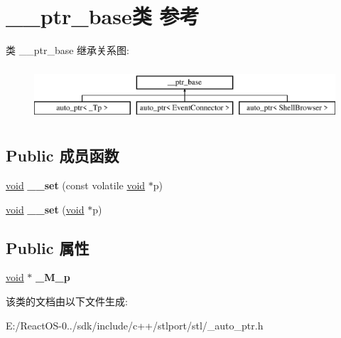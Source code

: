 \hypertarget{class____ptr__base}{}\section{\+\_\+\+\_\+ptr\+\_\+base类 参考}
\label{class____ptr__base}
类 \+\_\+\+\_\+ptr\+\_\+base 继承关系图\+:\begin{figure}[H]
\begin{center}
\leavevmode
\includegraphics[height=2.000000cm]{class____ptr__base}
\end{center}
\end{figure}
\subsection*{Public 成员函数}
\begin{DoxyCompactItemize}
\item 
\mbox{\label{class____ptr__base_ad736c0ef03c6616060e47909dd94dc2a}} 
\hyperlink{interfacevoid}{void} {\bfseries \+\_\+\+\_\+set} (const volatile \hyperlink{interfacevoid}{void} $\ast$p)
\item 
\mbox{\label{class____ptr__base_a686a2da487cfeb2068705367bb542556}} 
\hyperlink{interfacevoid}{void} {\bfseries \+\_\+\+\_\+set} (\hyperlink{interfacevoid}{void} $\ast$p)
\end{DoxyCompactItemize}
\subsection*{Public 属性}
\begin{DoxyCompactItemize}
\item 
\mbox{\label{class____ptr__base_aa4f7feabcba35fc5e0b6253e063146ab}} 
\hyperlink{interfacevoid}{void} $\ast$ {\bfseries \+\_\+\+M\+\_\+p}
\end{DoxyCompactItemize}


该类的文档由以下文件生成\+:\begin{DoxyCompactItemize}
\item 
E\+:/\+React\+O\+S-\/0../sdk/include/c++/stlport/stl/\+\_\+auto\+\_\+ptr.\+h\end{DoxyCompactItemize}
